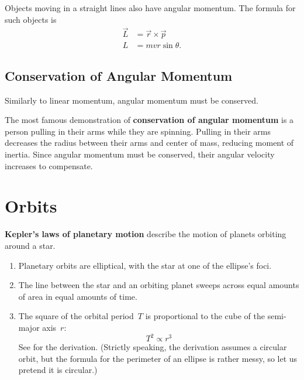 Objects moving in a straight lines also have angular momentum.
The formula for such objects is
\begin{subequations}
    \begin{align}
        \vec{L} &= \vec{r} \times \vec{p} \\
        L &= m v r \sin\theta. \label{eq:angular-momentum-linear-velocity}
    \end{align}
\end{subequations}

\subsection{Conservation of Angular Momentum}

Similarly to linear momentum, angular momentum must be conserved.

The most famous demonstration of \textbf{conservation of angular momentum}
is a person pulling in their arms while they are spinning.
Pulling in their arms decreases the radius between their arms and
center of mass,
reducing moment of inertia.
Since angular momentum must be conserved,
their angular velocity increases to compensate.

\section{Orbits} \label{sec:orbits}

\textbf{Kepler's laws of planetary motion}
describe the motion of planets orbiting around a star.
\begin{enumerate}
    \item Planetary orbits are elliptical,
        with the star at one of the ellipse's foci.
    \item \label{itm:keplers-2nd-law}
        The line between the star and an orbiting planet
        sweeps across equal amounts of area in equal amounts of time.
    \item The square of the orbital period~\(T\) is proportional to
        the cube of the semi-major axis~\(r\):
        \begin{equation}
            T^2 \propto r^3
        \end{equation}
        See  for the derivation.
        (Strictly speaking, the derivation assumes a circular orbit,
            but the formula for the perimeter of an ellipse is rather messy,
        so let us pretend it is circular.)
\end{enumerate}

